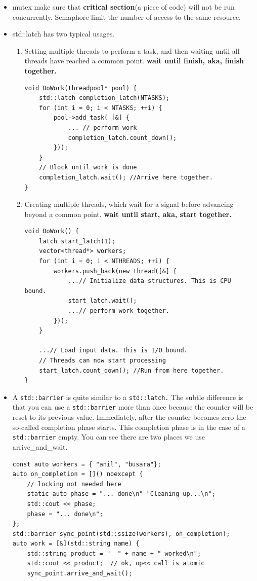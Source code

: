 \documentclass[a4paper,11pt,twoside]{book}
\begin{document}
\begin{itemize}
    \item mutex make sure that \textbf{critical section}(a piece of code) will not be run concurrently. Semaphore limit the number of access to the same resource. 
    
    \item std::latch has two typical usages. 
\begin{enumerate}


    
	\item Setting multiple threads to perform a task, and then waiting until all threads have reached a common point. \textbf{wait until finish, aka, finish together.}
	
\begin{lstlisting}[numbers=none]
void DoWork(threadpool* pool) {
	std::latch completion_latch(NTASKS);
	for (int i = 0; i < NTASKS; ++i) {
		pool->add_task( [&] {
			... // perform work
			completion_latch.count_down();
		}));
	}
	// Block until work is done
	completion_latch.wait(); //Arrive here together.
}
\end{lstlisting}	

	\item Creating multiple threads, which wait for a signal before advancing beyond a common point. \textbf{wait until start, aka, start together.}
\begin{lstlisting}[numbers=none]
void DoWork() {
	latch start_latch(1);
	vector<thread*> workers;
	for (int i = 0; i < NTHREADS; ++i) {
		workers.push_back(new thread([&] {
			...// Initialize data structures. This is CPU bound.
			start_latch.wait();
			...// perform work together.
		}));
	}

	...// Load input data. This is I/O bound.
	// Threads can now start processing
	start_latch.count_down(); //Run from here together.
}
\end{lstlisting}

\end{enumerate}

	\item A \texttt{std::barrier} is quite similar to a \texttt{std::latch.} The subtle difference is that you can use a  \texttt{std::barrier} more than once because the counter will be reset to its previous value. Immediately, after the counter becomes zero the so-called completion phase starts. This completion phase is in the case of a \texttt{std::barrier} empty. You can see there are two places we use arrive\_and\_wait. 

\begin{lstlisting}[numbers=none]
const auto workers = { "anil", "busara"};
auto on_completion = []() noexcept { 
	// locking not needed here
	static auto phase = "... done\n" "Cleaning up...\n";
	std::cout << phase;
	phase = "... done\n";
};
std::barrier sync_point(std::ssize(workers), on_completion);
auto work = [&](std::string name) {
	std::string product = "  " + name + " worked\n";
	std::cout << product;  // ok, op<< call is atomic
	sync_point.arrive_and_wait();
	

\end{lstlisting}
\end{itemize}
\end{document}
